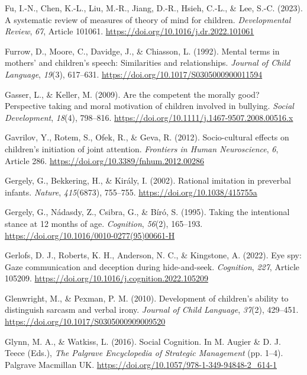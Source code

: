 \documentclass[
]{scrbook}
\newlength{\cslhangindent}
\newenvironment{CSLReferences}[2] %
 {\begin{list}{}{%
  \setlength{\itemindent}{0pt}
  \setlength{\leftmargin}{0pt}
  \setlength{\parsep}{0pt}
  \ifodd #1
   \setlength{\leftmargin}{\cslhangindent}
   \setlength{\itemindent}{-1\cslhangindent}
  \fi
  \setlength{\itemsep}{#2\baselineskip}}}
 {\end{list}}
\begin{document}
\begin{CSLReferences}{1}{0}
Fu, I.-N., Chen, K.-L., Liu, M.-R., Jiang, D.-R., Hsieh, C.-L., \& Lee, S.-C. (2023). A systematic review of measures of theory of mind for children. \emph{Developmental Review}, \emph{67}, Article 101061. \url{https://doi.org/10.1016/j.dr.2022.101061}

Furrow, D., Moore, C., Davidge, J., \& Chiasson, L. (1992). Mental terms in mothers' and children's speech: {Similarities} and relationships. \emph{Journal of Child Language}, \emph{19}(3), 617--631. \url{https://doi.org/10.1017/S0305000900011594}

Gasser, L., \& Keller, M. (2009). Are the competent the morally good? {Perspective} taking and moral motivation of children involved in bullying. \emph{Social Development}, \emph{18}(4), 798--816. \url{https://doi.org/10.1111/j.1467-9507.2008.00516.x}

Gavrilov, Y., Rotem, S., Ofek, R., \& Geva, R. (2012). Socio-cultural effects on children's initiation of joint attention. \emph{Frontiers in Human Neuroscience}, \emph{6}, Article 286. \url{https://doi.org/10.3389/fnhum.2012.00286}

Gergely, G., Bekkering, H., \& Király, I. (2002). Rational imitation in preverbal infants. \emph{Nature}, \emph{415}(6873), 755--755. \url{https://doi.org/10.1038/415755a}

Gergely, G., Nádasdy, Z., Csibra, G., \& Bíró, S. (1995). Taking the intentional stance at 12 months of age. \emph{Cognition}, \emph{56}(2), 165--193. \url{https://doi.org/10.1016/0010-0277(95)00661-H}

Gerlofs, D. J., Roberts, K. H., Anderson, N. C., \& Kingstone, A. (2022). Eye spy: {Gaze} communication and deception during hide-and-seek. \emph{Cognition}, \emph{227}, Article 105209. \url{https://doi.org/10.1016/j.cognition.2022.105209}

Glenwright, M., \& Pexman, P. M. (2010). Development of children's ability to distinguish sarcasm and verbal irony. \emph{Journal of Child Language}, \emph{37}(2), 429--451. \url{https://doi.org/10.1017/S0305000909009520}

Glynn, M. A., \& Watkiss, L. (2016). Social {Cognition}. In M. Augier \& D. J. Teece (Eds.), \emph{The {Palgrave Encyclopedia} of {Strategic Management}} (pp. 1--4). Palgrave Macmillan UK. \url{https://doi.org/10.1057/978-1-349-94848-2_614-1}


\end{CSLReferences}
\end{document}
